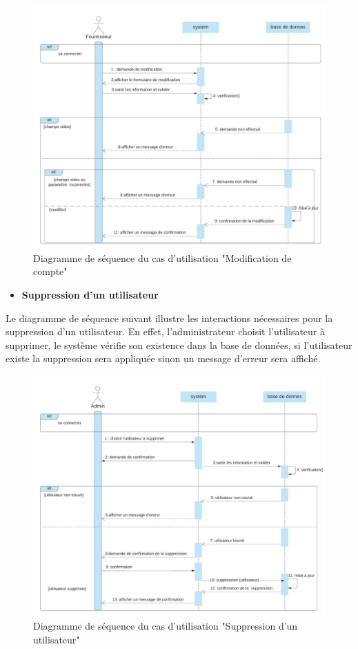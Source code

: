 \documentclass[french]{report}
\begin{document}
\begin{figure}[H]
    \centering
    \includegraphics[width=1\textwidth]{images/sequence diag modifier compte.jpg}
    \caption{Diagramme de séquence du cas d'utilisation "Modification de compte"}
    \label{fig:my_label}
\end{figure}

\begin{itemize}
    \item \textbf{Suppression d'un utilisateur}
\end{itemize}

Le diagramme de séquence suivant illustre les interactions nécessaires pour la
suppression d'un utilisateur. En effet, l'administrateur choisit l'utilisateur à
supprimer, le système vérifie son existence dans la base de données, si
l'utilisateur existe la suppression sera appliquée sinon un message d'erreur
sera affiché.

\begin{figure}[H]
    \centering
    \includegraphics[width=1\textwidth]{images/sequence diag supp user.jpg}
    \caption{Diagramme de séquence du cas d'utilisation "Suppression d'un utilisateur"}
    \label{fig:my_label}
\end{figure}
\end{document}
